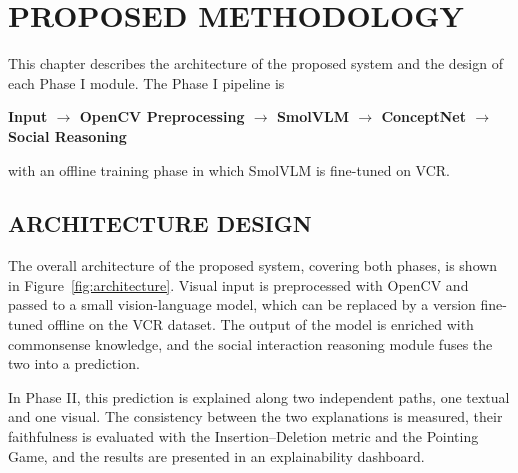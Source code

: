 
\chapter{PROPOSED METHODOLOGY}
\label{ch:method}

This chapter describes the architecture of the proposed system and the design of each Phase I module. The Phase I pipeline is
\begin{center}
\textbf{Input $\rightarrow$ OpenCV Preprocessing $\rightarrow$ SmolVLM $\rightarrow$ ConceptNet $\rightarrow$ Social Reasoning}
\end{center}
with an offline training phase in which SmolVLM is fine-tuned on VCR.

\section{ARCHITECTURE DESIGN}

The overall architecture of the proposed system, covering both phases, is shown in Figure~\ref{fig:architecture}. Visual input is preprocessed with OpenCV and passed to a small vision-language model, which can be replaced by a version fine-tuned offline on the VCR dataset. The output of the model is enriched with commonsense knowledge, and the social interaction reasoning module fuses the two into a prediction.

In Phase II, this prediction is explained along two independent paths, one textual and one visual. The consistency between the two explanations is measured, their faithfulness is evaluated with the Insertion--Deletion metric and the Pointing Game, and the results are presented in an explainability dashboard.

